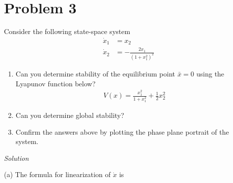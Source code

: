 \documentclass{article}
\begin{document}
  \section{Problem 3}

  Consider the following state-space system
  \begin{align*}
    \dot{x}_1 &= x_2 \\
    \dot{x}_2 &= -\frac{2x_1}{(1+x_1^2)^2}
  \end{align*}

  \begin{enumerate}[label=(\alph*)]
    \item Can you determine stability of the equilibrium point $\bar{x}=0$ using
      the Lyapunov function below?
      \begin{align*}
        V(x)=\frac{x_1^2}{1+x_1^2}+\frac{1}{2}x_2^2
      \end{align*}
    \item Can you determine global stability?
    \item Confirm the answers above by plotting the phase plane portrait of the
      system.
  \end{enumerate}

  \vspace{3mm}
  
  \noindent \textit{Solution} \newline \newline

  (a) The formula for linearization of $\dot{x}$ is
\end{document}
